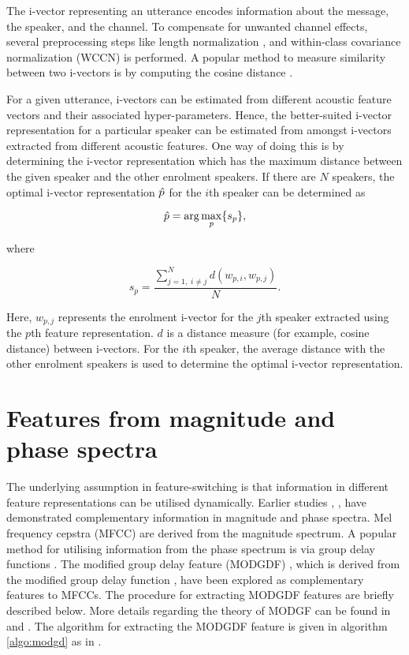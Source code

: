 \documentclass{article}
\begin{document}
The i-vector representing an utterance encodes information about the message,
the speaker, and the channel. To compensate for unwanted channel effects,
several preprocessing steps like length normalization \cite{garcia_lengthNorm},
and within-class covariance normalization (WCCN) \cite{wccn} is performed. A
popular method to measure similarity between two i-vectors is by computing the
cosine distance \cite{dehak_ivector}.

For a given utterance, i-vectors can be estimated from different acoustic
feature vectors and their associated hyper-parameters. Hence, the
better-suited i-vector representation for a particular speaker can be estimated
from amongst i-vectors extracted from different acoustic features. One way of
doing this is by determining the i-vector representation which has the maximum
distance between the given speaker and the other enrolment speakers. If there
are $N$ speakers, the optimal i-vector representation $\Hat{p}$ 
for the $i$th speaker can be determined as

\begin{equation}
\Hat{p} = \arg\max_p \{s_p\},
\label{eq:opt_ivec}
\end{equation}

where 

\begin{equation}
s_p = \frac{\displaystyle \sum_{j=1, \; i \neq j}^N d(w_{p,i},w_{p,j})}{N}.
\label{eq:sp}
\end{equation}

Here, $w_{p,j}$ represents the enrolment i-vector for the $j$th speaker
extracted using the $p$th feature representation. $d$ is a distance measure (for
example, cosine distance) between i-vectors. For the $i$th speaker, the average
distance with the other enrolment speakers is used to determine the optimal
i-vector representation. 

\section{Features from magnitude and phase spectra}
\label{sec:featExt}

The underlying assumption in feature-switching is that information in different
feature representations can be utilised dynamically. Earlier studies
\cite{complement1}, \cite{complement2}, \cite{complement2} have demonstrated
complementary information in magnitude and phase spectra. Mel frequency cepstra
(MFCC) are derived from the magnitude spectrum. A popular method for utilising
information from the phase spectrum is via group delay functions
\cite{group_delay}. The modified group delay feature (MODGDF) \cite{modgd_feat},
which is derived from the modified group delay function \cite{modgd_func}, have
been explored as complementary features to MFCCs. The procedure for extracting
MODGDF features are briefly described below. More details regarding the theory
of MODGF can be found in \cite{modgd_func} and \cite{modgd_feat}. The algorithm
for extracting the MODGDF feature is given in algorithm \ref{algo:modgd} as 
in \cite{hegdeModgdf}.
\end{document}
